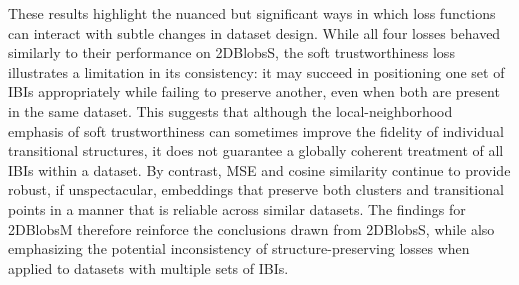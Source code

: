 These results highlight the nuanced but significant ways in which loss functions can interact with subtle changes in dataset design. While all four losses behaved similarly to their performance on 2DBlobsS, the soft trustworthiness loss illustrates a limitation in its consistency: it may succeed in positioning one set of IBIs appropriately while failing to preserve another, even when both are present in the same dataset. This suggests that although the local-neighborhood emphasis of soft trustworthiness can sometimes improve the fidelity of individual transitional structures, it does not guarantee a globally coherent treatment of all IBIs within a dataset. By contrast, MSE and cosine similarity continue to provide robust, if unspectacular, embeddings that preserve both clusters and transitional points in a manner that is reliable across similar datasets. The findings for 2DBlobsM therefore reinforce the conclusions drawn from 2DBlobsS, while also emphasizing the potential inconsistency of structure-preserving losses when applied to datasets with multiple sets of IBIs.

